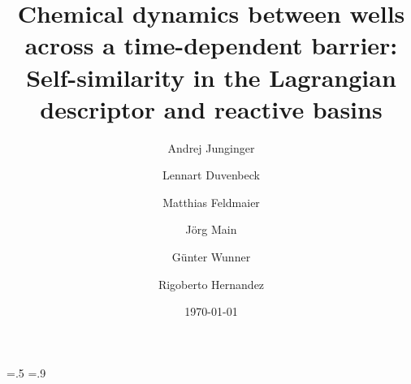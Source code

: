 \documentclass[aip,reprint,jcp,amsmath,amssymb,superscriptaddress,floatfix]{revtex4-1}
\begin{document}
\newlength\figurewide
\ifFIGoneColumn
  \figurewide=.5\columnwidth
\else
  \figurewide=.9\columnwidth
\fi

\title{Chemical dynamics 
between wells
across a time-dependent barrier:
Self-similarity in the Lagrangian descriptor
and reactive basins}
%
\author{Andrej Junginger}
\author{Lennart Duvenbeck}
\author{Matthias Feldmaier}
\author{J\"org Main}
\author{G\"unter Wunner}

\author{Rigoberto Hernandez}



\date{\today}
\newcommand{\EQ}{Eq.}
\newcommand{\EQS}{Eqs.}
\newcommand{\FIG}{Fig.}
\newcommand{\FIGS}{Figs.}
\newcommand{\REF}{Ref.}
\newcommand{\REFS}{Refs.}
\newcommand{\SEC}{Sec.}
\newcommand{\SECS}{Secs.}
\newcommand{\eg}{e.\,g.}
\newcommand{\cf}{cf.}
\newcommand{\ie}{i.\,e.}
\newcommand{\ud}{\mathrm{d}}
\newcommand{\ue}{\mathrm{e}}
\newcommand{\kB}{k_\mathrm{B}}
\newcommand{\VLiCN}{V_\mathrm{LiCN}}
\newcommand{\VCN}{V_\mathrm{C-N}}
\newcommand{\VLi}{V_\mathrm{Li-CN}}
\renewcommand{\vec}[1]{\boldsymbol{#1}}
\newcommand{\qq}{\vec{q}}
\newcommand{\xx}{\vec{x}}
\newcommand{\vv}{\vec{v}}
\newcommand{\transpose}{\mathsf{T}}
\newcommand{\reactantpop}{\mathcal{P}}
\newcommand{\kf}{k_\mathrm{f}}
\newcommand{\etal}{\emph{et al.}}
\newcommand{\LD}{\mathcal{L}}
\newcommand{\LDbo}{\mathcal{L}_\text{bo}}
\newcommand{\LDwo}{\mathcal{L}_\text{wo}}
\newcommand{\LDf}{\LD^\text{(f)}}
\newcommand{\LDb}{\LD^\text{(b)}}
\newcommand{\LDfb}{\LD^\text{(fb)}}
\newcommand{\LDfbw}{\LD^\text{(fbw)}}
\newcommand{\Ws}{\mathcal{W}_\text{s}}
\newcommand{\Wu}{\mathcal{W}_\text{u}}
\newcommand{\Wsu}{\mathcal{W}_\text{s,u}}
\newcommand{\TSt}{\mathcal{T}}
\newcommand{\weightingf}{\chi^\text{(f)}}
\newcommand{\weightingb}{\chi^\text{(b)}}
\newcommand{\weightingfb}{\chi^\text{(f,b)}}
\newcommand{\vtherm}{v_\text{therm}}
\newcommand{\comment}[1]{\textsf{\textcolor{orange}{[#1]}}}
\newcommand{\sno}[1]{_\mathrm{#1}}
\newcommand{\no}[1]{\mathrm{#1}}
\newcommand{\acnew}[1]{\acfi{#1}\acused{#1}}
\newcommand{\VMorse}{V_\text{Morse}}
\newcommand{\VGauss}{V_\text{Gauss}}
\newcommand{\Eg}{E_\text{G}}
\newcommand{\xb}{x_\text{b}}
\newcommand{\subbo}{_\text{bo}}
\newcommand{\subwo}{_\text{wo}}
\newcommand{\xtsr}{\bar{x}}
\end{document}
